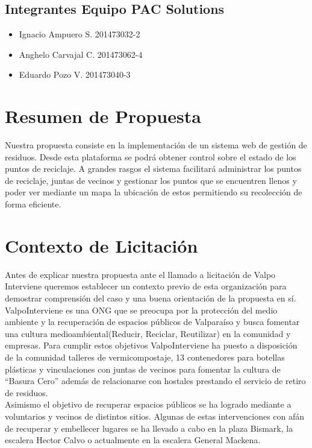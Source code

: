 \documentclass[paper=letter, fontsize=11pt]{scrartcl} %
\numberwithin{equation}{section} %
\numberwithin{figure}{section} %
\numberwithin{table}{section} %
\begin{document}
\subsection*{Integrantes Equipo PAC Solutions}
\begin {itemize}
\item Ignacio Ampuero S. 201473032-2
\item Anghelo Carvajal C. 201473062-4 
\item Eduardo Pozo V. 201473040-3
\end{itemize} 
\section{Resumen de Propuesta}
Nuestra propuesta consiste en la implementación de un sistema web de gestión de residuos. Desde esta plataforma se podrá obtener control sobre el estado de los puntos de reciclaje. A grandes rasgos el sistema facilitará administrar los puntos de reciclaje, juntas de vecinos y gestionar los puntos que se encuentren llenos y poder ver mediante un mapa la ubicación de estos permitiendo su recolección de forma eficiente.

\section{Contexto de Licitación}
Antes de explicar nuestra propuesta ante el llamado a licitación de Valpo Interviene queremos establecer un contexto previo de esta organización para demostrar comprensión del caso y una buena orientación de la propuesta en sí.\\

ValpoInterviene es una ONG que se preocupa por la protección del medio ambiente y la recuperación de espacios públicos de Valparaíso y busca fomentar una cultura medioambiental(Reducir, Reciclar, Reutilizar) en la comunidad y empresas. Para cumplir estos objetivos ValpoInterviene ha puesto a disposición de la comunidad talleres de vermicompostaje, 13 contenedores para botellas plásticas y vinculaciones con juntas de vecinos para fomentar la cultura de “Basura Cero” además de relacionarse con hostales prestando el servicio de retiro de residuos.\\

Asimismo el objetivo de recuperar espacios públicos se ha logrado mediante a voluntarios y vecinos de distintos sitios. Algunas de estas intervenciones con afán de recuperar y embellecer lugares se ha llevado a cabo en la plaza Bismark, la escalera Hector Calvo o actualmente en la escalera General Mackena.\\
\end{document}
